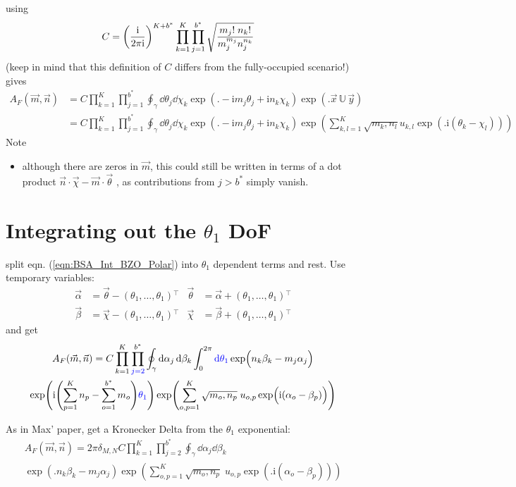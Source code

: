 \documentclass[
	english,
	a4paper,
	fontsize=10pt,
	parskip=half,
	titlepage=true,
	DIV=12,
	final
]{scrreprt}
\newcommand*{\transp}{\ensuremath{^\intercal}}
\newcommand*{\iunit}{\ensuremath{\mathrm{i}}}
\begin{document}
using
\begin{align}
	C
&=
	\qty(
		\frac{\iunit}{2\pi\iunit}
	)^{K + b^*}
	\prod_{k=1}^{K}
	\prod_{j=1}^{b^*}
		\sqrt{\frac
			{m_j! \; n_k!}
			{m_j^{m_j}  n_j^{n_k}}
		}
\end{align}
({\color{red}keep in mind that this definition of $C$ differs from the fully-occupied scenario!})
gives
\begin{align}
	A_F(\vec{m}, \vec{n})
&=
	C
	\prod_{k=1}^{K}
	\prod_{j=1}^{b^*}
		\oint_{\gamma}
			\dd{\theta_j} \dd{\chi_k}
	\exp(
		\Big.
		-\iunit m_j \theta_j
		+\iunit n_k \chi  _k
	)
	\exp( \Big. \vec{x} \, \mathbb{U} \, \vec{y}) \\
&=
	C
	\prod_{k=1}^{K}
	\prod_{j=1}^{b^*}
		\oint_{\gamma}
			\dd{\theta_j} \dd{\chi_k}
	\exp(
		\Big.
		-\iunit m_j \theta_j
		+\iunit n_k \chi  _k
	)
	\exp(
		\sum_{k,l=1}^{K}
		\sqrt{m_k, n_l}
		u_{k,l}
		\exp(\Big.
			\iunit(\theta_k - \chi_l)
		)
	)
	\label{eqn:BSA_Int_BZO_Polar}
\end{align}
Note
\begin{itemize}
\item although there are zeros in $\vec{m}$, this could still be written in terms of a dot product
	$\vec{n} \cdot \vec{\chi} - \vec{m} \cdot \vec{\theta}$
	, as contributions from $j > b^*$ simply vanish.
\end{itemize}

\section{Integrating out the $\theta_1$ DoF}
split eqn. (\ref{eqn:BSA_Int_BZO_Polar}) into $\theta_1$ dependent terms and rest. Use temporary variables:
\begin{align}
	\vec{\alpha} &= \vec{\theta} - (\theta_1, \ldots, \theta_1)\transp
	&
	\vec{\theta} &= \vec{\alpha} + (\theta_1, \ldots, \theta_1)\transp
\\
	\vec{\beta } &= \vec{\chi  } - (\theta_1, \ldots, \theta_1)\transp
	&
	\vec{\chi  } &= \vec{\beta } + (\theta_1, \ldots, \theta_1)\transp
\end{align}
and get
\begin{multline}
	A_F(\vec{m}, \vec{n})
=
	C
	\prod_{k=1}^{K}
	\prod_{{\color{blue} j=2}}^{b^*}
		\oint_{\gamma}
			\dd{\alpha_j} \dd{\beta_k}
		\int_{0}^{2\pi} {\color{blue} \dd{\theta_1}}
			\exp(
				\Big.
				n_k \beta _k   -
				m_j \alpha_j
			)
\\
	\exp(
		\iunit \qty(
			\sum_{p=1}^{K}   n_p   -
			\sum_{o=1}^{b^*} m_o
		)
		{\color{blue} \theta_1}
	)
	\exp(
		\sum_{o,p=1}^{K}
		\sqrt{m_o, n_p} \;
		u_{o,p}
		\exp(\Big.
			\iunit(\alpha_o - \beta_p)
		)
	)
\end{multline}

As in Max' paper, get a Kronecker Delta from the $\theta_1$ exponential:
\begin{multline}	
	A_F(\vec{m}, \vec{n})
=
	2\pi \delta_{M,N} C
	\prod_{k=1}^{K}
	\prod_{j=2}^{b^*}
		\oint_{\gamma}
			\dd{\alpha_j} \dd{\beta_k}
\\
	\exp(
		\Big.
		n_k \beta _k   -
		m_j \alpha_j
	)
	\exp(
		\sum_{o,p=1}^{K}
		\sqrt{m_o, n_p} \;
		u_{o,p}
		\exp(\Big.
			\iunit(\alpha_o - \beta_p)
		)
	)
\end{multline}
\end{document}
